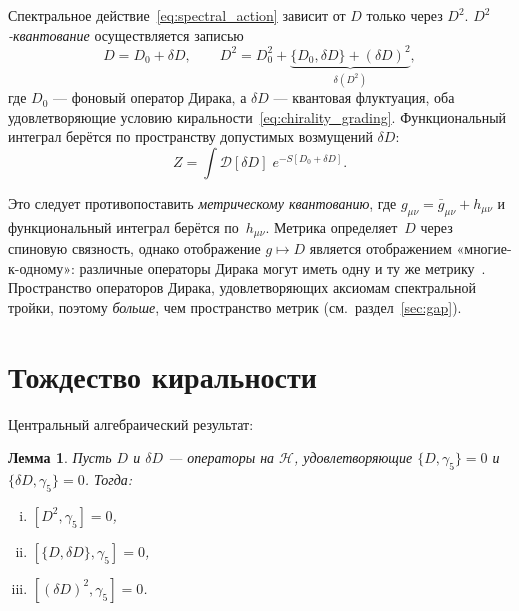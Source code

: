 \documentclass[12pt,a4paper]{article}
\newtheorem{lemma}[theorem]{Лемма}
\theoremstyle{definition}
\theoremstyle{remark}
\newcommand{\Hilb}{\mathcal{H}}
\begin{document}
Спектральное действие~\eqref{eq:spectral_action} зависит от $D$ только
через $D^2$.  \emph{$D^2$-квантование} осуществляется записью
\begin{equation}\label{eq:D2_quantization}
  D = D_0 + \delta D, \qquad
  D^2 = D_0^2 + \underbrace{\{D_0, \delta D\} + (\delta D)^2}_{\delta(D^2)},
\end{equation}
где $D_0$ --- фоновый оператор Дирака, а $\delta D$ --- квантовая
флуктуация, оба удовлетворяющие условию
киральности~\eqref{eq:chirality_grading}.
Функциональный интеграл берётся по пространству допустимых возмущений
$\delta D$:
\begin{equation}\label{eq:path_integral}
  Z = \int \mathcal{D}[\delta D]\; e^{-S[D_0 + \delta D]}.
\end{equation}

Это следует противопоставить \emph{метрическому квантованию}, где
$g_{\mu\nu} = \bar{g}_{\mu\nu} + h_{\mu\nu}$ и функциональный интеграл
берётся по~$h_{\mu\nu}$.  Метрика определяет~$D$ через спиновую
связность, однако отображение $g \mapsto D$ является отображением
«многие-к-одному»: различные операторы Дирака могут иметь одну и ту же
метрику~\cite{Barrett:2015matrix}.  Пространство операторов Дирака,
удовлетворяющих аксиомам спектральной тройки, поэтому \emph{больше},
чем пространство метрик (см.\ раздел~\ref{sec:gap}).

\section{Тождество киральности}
\label{sec:chirality_identity}

Центральный алгебраический результат:

\begin{lemma}\label{lem:anticommute}
Пусть $D$ и $\delta D$ --- операторы на $\Hilb$, удовлетворяющие
$\{D, \gamma_5\} = 0$ и $\{\delta D, \gamma_5\} = 0$.  Тогда:
\begin{enumerate}[(i)]
  \item $[D^2, \gamma_5] = 0$,
  \item $[\{D, \delta D\}, \gamma_5] = 0$,
  \item $[(\delta D)^2, \gamma_5] = 0$.
\end{enumerate}
\end{lemma}
\end{document}
